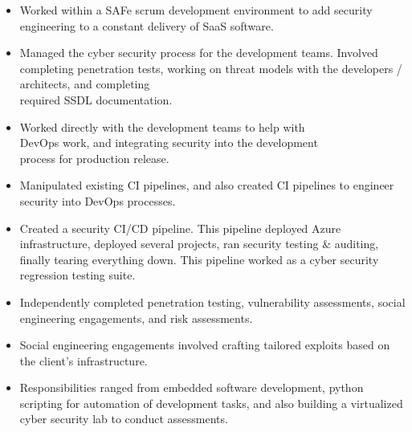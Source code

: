 \documentclass[10pt,a4paper,ragged2e]{rohrbach}
\begin{document}
\begin{paracol}{2}
\pagebreak

\begin{itemize}
  \item Worked within a SAFe scrum development environment to add security engineering to a constant delivery of SaaS software.
  \item Managed the cyber security process for the development teams. Involved completing penetration tests, working on threat models with the developers / architects, and completing\\ required SSDL documentation. 
  \item Worked directly with the development teams to help with\\ DevOps work, and integrating security into the development\\ process for production release.
  \item Manipulated existing CI pipelines, and also created CI pipelines to engineer security into DevOps processes.
  \item Created a security CI/CD pipeline. This pipeline deployed Azure infrastructure, deployed several projects, ran security testing \& auditing, finally tearing everything down. This pipeline worked as a cyber security regression testing suite.
\end{itemize}

\divider

\begin{itemize}
  \item Independently completed penetration testing, vulnerability \break assessments, social engineering engagements, and risk assessments. 
  \item Social engineering engagements involved crafting tailored exploits based on the client’s infrastructure.
\end{itemize}

\divider

\begin{itemize}
  \item Responsibilities ranged from embedded software development, python scripting for automation of development tasks, and also building a virtualized cyber security lab to conduct assessments. 
\end{itemize}


\end{paracol}
\end{document}
